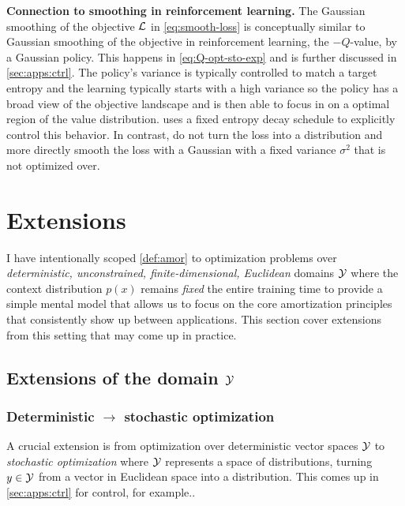 \textbf{Connection to smoothing in reinforcement learning.}
The Gaussian smoothing of the objective ${\mathcal{L}}$ in \cref{eq:smooth-loss}
is conceptually similar to Gaussian smoothing of the
objective in reinforcement learning, \ie the $-Q$-value,
by a Gaussian policy. This happens in
\cref{eq:Q-opt-sto-exp} and is further discussed
in \cref{sec:apps:ctrl}.
The policy's variance is typically controlled to match a
target entropy \citet{haarnoja2018soft} and the learning
typically starts with a high variance so the policy has a
broad view of the objective landscape and is then able to focus in
on a optimal region of the value distribution.
\citet{amos2021model} uses a fixed entropy decay schedule to
explicitly control this behavior.
In contrast, \citet{metz2019understanding,merchant2021learn2hop}
do not turn the loss into a distribution and more directly
smooth the loss with a Gaussian with a fixed variance $\sigma^2$
that is not optimized over.

\section{Extensions}
\label{sec:extensions}

I have intentionally scoped \cref{def:amor} to optimization problems
over \emph{deterministic, unconstrained, finite-dimensional, Euclidean}
domains ${\mathcal{Y}}$ where the context distribution $p(x)$
remains \emph{fixed} the
entire training time to provide a simple mental model that
allows us to focus on the core amortization principles
that consistently show up between applications.
This section cover extensions from this setting that may come up in practice.

\subsection{Extensions of the domain ${\mathcal{Y}}$}
\label{sec:extensions:domain}
\subsubsection{Deterministic $\rightarrow$ stochastic optimization}
\label{sec:extensions:sto}
A crucial extension is from optimization over deterministic vector
spaces ${\mathcal{Y}}$ to \emph{stochastic optimization}
where ${\mathcal{Y}}$ represents a space of distributions,
turning $y\in{\mathcal{Y}}$ from a vector in Euclidean space
into a distribution.
This comes up in \cref{sec:apps:ctrl} for control,
for example..

